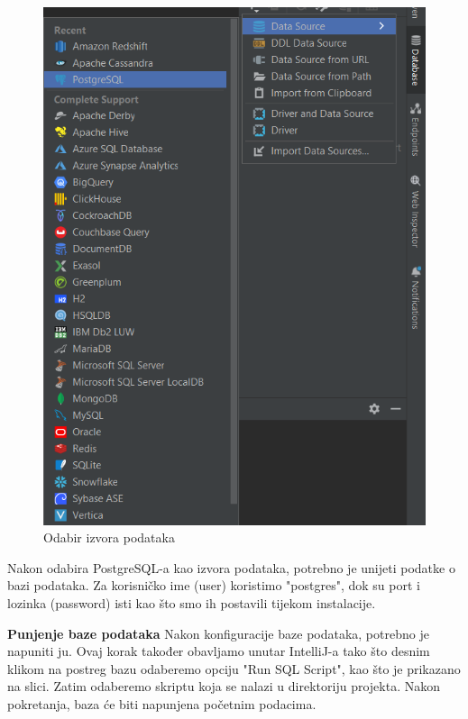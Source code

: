 			\begin{figure}[H]
				\includegraphics[scale=0.3]{slike/postgreSql.png} 
				\centering
				\caption{Odabir izvora podataka}
				\label{fig:promjene}
			\end{figure}
			Nakon odabira PostgreSQL-a kao izvora podataka, potrebno je unijeti podatke o bazi podataka. Za korisničko ime (user) koristimo "postgres", dok su port i lozinka (password) isti kao što smo ih postavili tijekom instalacije.
			
			\textbf{Punjenje baze podataka}
			Nakon konfiguracije baze podataka, potrebno je napuniti ju. Ovaj korak također obavljamo unutar IntelliJ-a tako što desnim klikom na postreg bazu odaberemo opciju "Run SQL Script", kao što je prikazano na slici. Zatim odaberemo skriptu koja se nalazi u direktoriju projekta. Nakon pokretanja, baza će biti napunjena početnim podacima.
			
